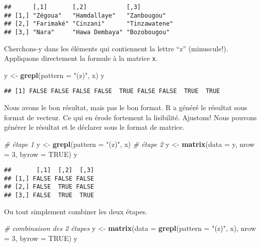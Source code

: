 \documentclass[]{book}
\newenvironment{Shaded}{\begin{snugshade}}{\end{snugshade}}
\newcommand{\KeywordTok}[1]{\textcolor[rgb]{0.13,0.29,0.53}{\textbf{#1}}}
\newcommand{\DataTypeTok}[1]{\textcolor[rgb]{0.13,0.29,0.53}{#1}}
\newcommand{\DecValTok}[1]{\textcolor[rgb]{0.00,0.00,0.81}{#1}}
\newcommand{\StringTok}[1]{\textcolor[rgb]{0.31,0.60,0.02}{#1}}
\newcommand{\CommentTok}[1]{\textcolor[rgb]{0.56,0.35,0.01}{\textit{#1}}}
\newcommand{\OtherTok}[1]{\textcolor[rgb]{0.56,0.35,0.01}{#1}}
\newcommand{\NormalTok}[1]{#1}
\begin{document}
\begin{verbatim}
##      [,1]       [,2]           [,3]         
## [1,] "Zégoua"   "Hamdallaye"   "Zanbougou"  
## [2,] "Farimaké" "Cinzani"      "Tinzawatene"
## [3,] "Nara"     "Hawa Dembaya" "Bozobougou"
\end{verbatim}

Cherchons-y dans les éléments qui contiennent la lettre ``z''
(minuscule!). Appliquons directement la formule à la matrice \texttt{x}.

\begin{Shaded}
\begin{Highlighting}[]
\NormalTok{y <-}\StringTok{ }\KeywordTok{grepl}\NormalTok{(}\DataTypeTok{pattern =} \StringTok{"(z)"}\NormalTok{, x)}
\NormalTok{y}
\end{Highlighting}
\end{Shaded}

\begin{verbatim}
## [1] FALSE FALSE FALSE FALSE  TRUE FALSE FALSE  TRUE  TRUE
\end{verbatim}

Nous avons le bon résultat, mais pas le bon format. R a généré le
résultat sous format de vecteur. Ce qui en érode fortement la
lisibilité. Ajustons! Nous pouvons générer le résultat et le déclarer
sous le format de matrice.

\begin{Shaded}
\begin{Highlighting}[]
\CommentTok{# étape 1}
\NormalTok{y <-}\StringTok{ }\KeywordTok{grepl}\NormalTok{(}\DataTypeTok{pattern =} \StringTok{"(z)"}\NormalTok{, x) }
\CommentTok{# étape 2}
\NormalTok{y <-}\StringTok{ }\KeywordTok{matrix}\NormalTok{(}\DataTypeTok{data =}\NormalTok{ y, }\DataTypeTok{nrow =} \DecValTok{3}\NormalTok{, }\DataTypeTok{byrow =} \OtherTok{TRUE}\NormalTok{) }
\NormalTok{y}
\end{Highlighting}
\end{Shaded}

\begin{verbatim}
##       [,1]  [,2]  [,3]
## [1,] FALSE FALSE FALSE
## [2,] FALSE  TRUE FALSE
## [3,] FALSE  TRUE  TRUE
\end{verbatim}

Ou tout simplement combiner les deux étapes.

\begin{Shaded}
\begin{Highlighting}[]
\CommentTok{# combinaison des 2 étapes}
\NormalTok{y <-}\StringTok{ }\KeywordTok{matrix}\NormalTok{(}\DataTypeTok{data =} \KeywordTok{grepl}\NormalTok{(}\DataTypeTok{pattern =} \StringTok{"(z)"}\NormalTok{, x), }\DataTypeTok{nrow =} \DecValTok{3}\NormalTok{, }\DataTypeTok{byrow =} \OtherTok{TRUE}\NormalTok{) }
\NormalTok{y}
\end{Highlighting}
\end{Shaded}
\end{document}
